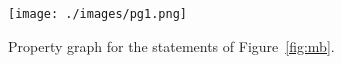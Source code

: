 
\begin{figure}[t]
\centering
\texttt{[image: ./images/pg1.png]}
\caption{Property graph for the statements of Figure~\ref{fig:mb}.\label{fig:pg1}}
\end{figure}


